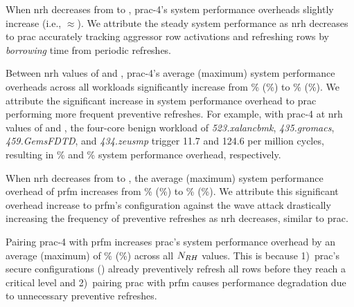 When \gls{nrh} decreases from  to , \gls{prac}-4's system performance overheads slightly increase (i.e., $\approx$).
We attribute the steady system performance as \gls{nrh} decreases to \gls{prac} accurately tracking aggressor row activations and refreshing rows by \emph{borrowing} time from periodic refreshes.

Between \gls{nrh} values of  and , \gls{prac}-4's average (maximum) system performance overheads across all workloads significantly increase from \% (\%) to \% (\%).
We attribute the significant increase in system performance overhead to \gls{prac} performing more frequent preventive refreshes.
For example, with \gls{prac}-4 at \gls{nrh} values of  and , the four-core benign workload of \emph{523.xalancbmk}, \emph{435.gromacs}, \emph{459.GemsFDTD}, and \emph{434.zeusmp} trigger 11.7 and 124.6  per million cycles, resulting in \% and \% system performance overhead, respectively.

When \gls{nrh} decreases from  to , the average (maximum) system performance overhead of \gls{prfm} increases from \% (\%) to \% (\%).
We attribute this significant overhead increase to \gls{prfm}'s configuration against the wave attack drastically increasing the frequency of preventive refreshes as \gls{nrh} decreases, similar to \gls{prac}.

Pairing \gls{prac}-4 with \gls{prfm} increases \gls{prac}'s system performance overhead by an average (maximum) of \% (\%) across all $N_{RH}{}$ values.
This is because 1)~\gls{prac}'s secure configurations () already preventively refresh all rows before they reach a critical level and
2)~pairing \gls{prac} with \gls{prfm} causes performance degradation due to unnecessary preventive refreshes.

